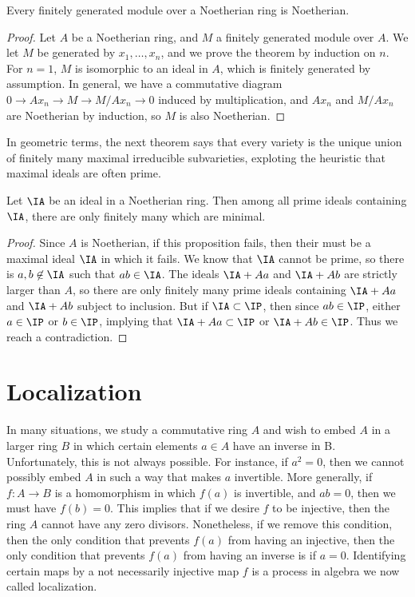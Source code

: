 \begin{theorem}
    Every finitely generated module over a Noetherian ring is Noetherian.
\end{theorem}
\begin{proof}
    Let $A$ be a Noetherian ring, and $M$ a finitely generated module over $A$. We let $M$ be generated by $x_1, \dots, x_n$, and we prove the theorem by induction on $n$. For $n = 1$, $M$ is isomorphic to an ideal in $A$, which is finitely generated by assumption. In general, we have a commutative diagram $0 \to Ax_n \to M \to M/Ax_n \to 0$ induced by multiplication, and $Ax_n$ and $M/Ax_n$ are Noetherian by induction, so $M$ is also Noetherian.
\end{proof}

In geometric terms, the next theorem says that every variety is the unique union of finitely many maximal irreducible subvarieties, exploting the heuristic that maximal ideals are often prime.

\begin{theorem}
    Let $\IA$ be an ideal in a Noetherian ring. Then among all prime ideals containing $\IA$, there are only finitely many which are minimal.
\end{theorem}
\begin{proof}
    Since $A$ is Noetherian, if this proposition fails, then their must be a maximal ideal $\IA$ in which it fails. We know that $\IA$ cannot be prime, so there is $a,b \not \in \IA$ such that $ab \in \IA$. The ideals $\IA + Aa$ and $\IA + Ab$ are strictly larger than $A$, so there are only finitely many prime ideals containing $\IA + Aa$ and $\IA + Ab$ subject to inclusion. But if $\IA \subset \IP$, then since $ab \in \IP$, either $a \in \IP$ or $b \in \IP$, implying that $\IA + Aa \subset \IP$ or $\IA + Ab \in \IP$. Thus we reach a contradiction.
\end{proof}

\chapter{Localization}

In many situations, we study a commutative ring $A$ and wish to embed $A$ in a larger ring $B$ in which certain elements $a \in A$ have an inverse in B. Unfortunately, this is not always possible. For instance, if $a^2 = 0$, then we cannot possibly embed $A$ in such a way that makes $a$ invertible. More generally, if $f:A \to B$ is a homomorphism in which $f(a)$ is invertible, and $ab = 0$, then we must have $f(b) = 0$. This implies that if we desire $f$ to be injective, then the ring $A$ cannot have any zero divisors. Nonetheless, if we remove this condition, then the only condition that prevents $f(a)$ from having an injective, then the only condition that prevents $f(a)$ from having an inverse is if $a = 0$. Identifying certain maps by a not necessarily injective map $f$ is a process in algebra we now called localization.

